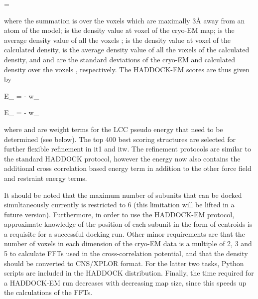 \startformula
{} = 
\stopformula

where the summation is over the voxels  which are maximally 3Å away from an
atom of the model;  is the density value at voxel  of the cryo-EM
map;  is the average density value of all the voxels ;
 is the density value at voxel  of the calculated density,
 is the average density value of all the voxels  of the
calculated density, and  and  are the standard
deviations of the cryo-EM and calculated density over the voxels ,
respectively. The HADDOCK-EM scores are thus given by

\placeformula[eq:haddock-em-it0]
\startformula
E_{} = \Eitr - w_{} \cdot {}
\stopformula

\startformula
E_{} = \Eitf - w_{} \cdot {}
\stopformula

where  and  are weight terms for the LCC
pseudo energy that need to be determined (see below). The top 400 best scoring
structures are selected for further flexible refinement in it1 and itw.  The
refinement protocols are similar to the standard HADDOCK protocol, however the
energy now also contains the additional cross correlation based energy term in
addition to the other force field and restraint energy terms. 

It should be noted that the maximum number of subunits that can be docked
simultaneously currently is restricted to 6 (this limitation will be lifted in
a future version).  Furthermore, in order to use the HADDOCK-EM protocol,
approximate knowledge of the position of each subunit in the form of centroids
is a requisite for a successful docking run.  Other minor requirements are that
the number of voxels in each dimension of the cryo-EM data is a multiple of 2,
3 and 5 to calculate FFTs used in the cross-correlation potential, and that the
density should be converted to CNS/XPLOR format.  For the latter two tasks,
Python scripts are included in the HADDOCK distribution.  Finally, the time
required for a HADDOCK-EM run decreases with decreasing map size, since this
speeds up the calculations of the FFTs.



